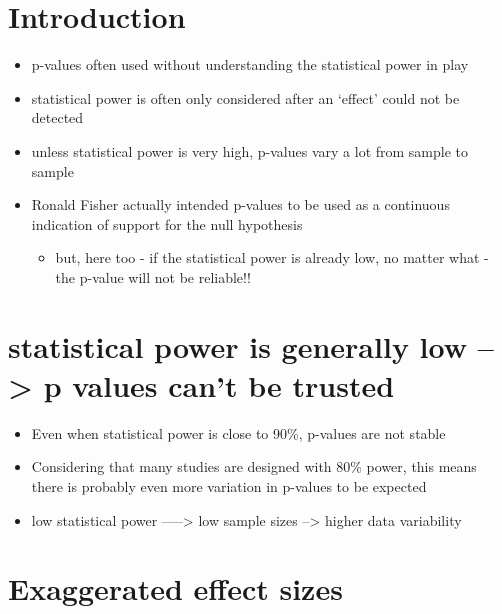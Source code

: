 \documentclass[
]{book}
\providecommand{\tightlist}{%
  \setlength{\itemsep}{0pt}\setlength{\parskip}{0pt}}
\begin{document}
\hypertarget{introduction-6}{%
\section{Introduction}\label{introduction-6}}

\begin{itemize}
\tightlist
\item
  p-values often used without understanding the statistical power in play
\item
  statistical power is often only considered after an `effect' could not be detected
\item
  unless statistical power is very high, p-values vary a lot from sample to sample
\item
  Ronald Fisher actually intended p-values to be used as a continuous indication of support for the null hypothesis

  \begin{itemize}
  \tightlist
  \item
    but, here too - if the statistical power is already low, no matter what - the p-value will not be reliable!!
  \end{itemize}
\end{itemize}

\hypertarget{statistical-power-is-generally-low-p-values-cant-be-trusted}{%
\section{statistical power is generally low --\textgreater{} p values can't be trusted}\label{statistical-power-is-generally-low-p-values-cant-be-trusted}}

\begin{itemize}
\tightlist
\item
  Even when statistical power is close to 90\%, p-values are not stable
\item
  Considering that many studies are designed with 80\% power, this means there is probably even more variation in p-values to be expected
\item
  low statistical power -----\textgreater{} low sample sizes --\textgreater{} higher data variability
\end{itemize}

\hypertarget{exaggerated-effect-sizes}{%
\section{Exaggerated effect sizes}\label{exaggerated-effect-sizes}}
\end{document}

